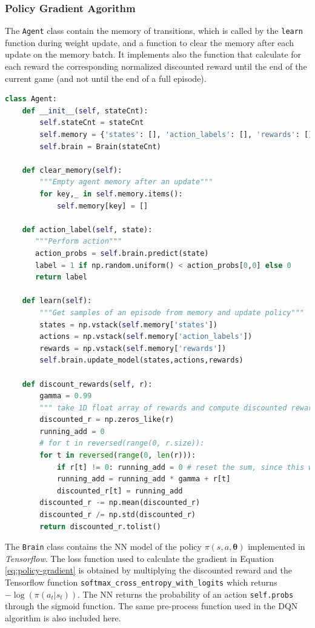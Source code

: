 \documentclass[a4paper, 11pt]{article}
\begin{document}
\subsubsection{Policy Gradient Agorithm}
The \texttt{Agent} class contain the memory of transitions, which is called by the \texttt{learn} function during weight update, and a function to clear the memory after each update on the memory batch. It implements also the function that calculate for each reward the corresponding normalized discounted reward until the end of the current game (and not until the end of a full episode). 
\begin{lstlisting}[language=Python, caption=Policy Gradient Agent definition, label={lst:PG-agent}]
class Agent:
    def __init__(self, stateCnt):
        self.stateCnt = stateCnt      
        self.memory = {'states': [], 'action_labels': [], 'rewards': []}
        self.brain = Brain(stateCnt) 
        
    def clear_memory(self):
        """Empty agent memory after an update"""
        for key,_ in self.memory.items():
            self.memory[key] = []
            
    def action_label(self, state):
       """Perform action"""
       action_probs = self.brain.predict(state)      
       label = 1 if np.random.uniform() < action_probs[0,0] else 0
       return label
    
    def learn(self):
        """Get samples of an episode from memory and update policy"""
        states = np.vstack(self.memory['states'])
        actions = np.vstack(self.memory['action_labels'])
        rewards = np.vstack(self.memory['rewards'])
        self.brain.update_model(states,actions,rewards)
    
    def discount_rewards(self, r):
        gamma = 0.99
        """ take 1D float array of rewards and compute discounted reward """
        discounted_r = np.zeros_like(r)
        running_add = 0
        # for t in reversed(range(0, r.size)):
        for t in reversed(range(0, len(r))):
            if r[t] != 0: running_add = 0 # reset the sum, since this was a game boundary (pong specific!)
            running_add = running_add * gamma + r[t]
            discounted_r[t] = running_add
        discounted_r -= np.mean(discounted_r)
        discounted_r /= np.std(discounted_r)
        return discounted_r.tolist()
\end{lstlisting}
The \texttt{Brain} class contains the NN model of the policy $\pi(s,a,\mathbf{\theta})$ implemented in \emph{Tensorflow}. The loss function used to calculate the gradient in Equation \ref{eq:policy-gradient} is obtained by multiplying the discounted reward and the Tensorflow function \texttt{softmax\_cross\_entropy\_with\_logits} which returns $-\log(\pi(a_t|s_t))$. The NN returns the probability of an action \texttt{self.probs}  through the sigmoid function. The same pre-process function used in the DQN algorithm is also included here.
\end{document}
